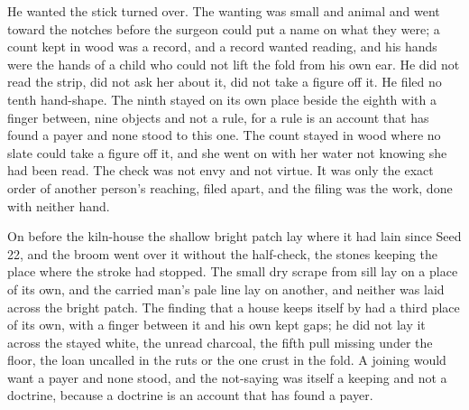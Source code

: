He wanted the stick turned over. The wanting was small and animal and went toward the notches before the surgeon could put a name on what they were; a count kept in wood was a record, and a record wanted reading, and his hands were the hands of a child who could not lift the fold from his own ear. He did not read the strip, did not ask her about it, did not take a figure off it. He filed no tenth hand-shape. The ninth stayed on its own place beside the eighth with a finger between, nine objects and not a rule, for a rule is an account that has found a payer and none stood to this one. The count stayed in wood where no slate could take a figure off it, and she went on with her water not knowing she had been read. The check was not envy and not virtue. It was only the exact order of another person's reaching, filed apart, and the filing was the work, done with neither hand.

On  before the kiln-house the shallow bright patch lay where it had lain since Seed 22, and the broom went over it without the half-check, the stones keeping the place where the stroke had stopped. The small dry scrape from  sill lay on a place of its own, and the carried man's pale line lay on another, and neither was laid across the bright patch. The finding that a house keeps itself by  had a third place of its own, with a finger between it and his own kept gaps; he did not lay it across the stayed white, the unread charcoal, the fifth pull missing under the floor, the loan uncalled in the ruts or the one crust in the fold. A joining would want a payer and none stood, and the not-saying was itself a keeping and not a doctrine, because a doctrine is an account that has found a payer.

